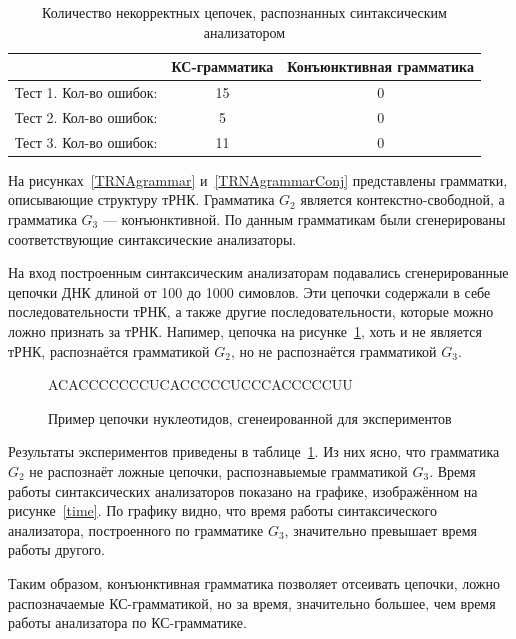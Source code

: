 \documentclass[14pt]{matmex-diploma}
\begin{document}
\begin{table}[h]
\begin{center}
  \begin{tabular}{ | c | c | c |}
    \hline
     & КС-грамматика & Конъюнктивная грамматика \\ \hline
    Тест 1. Кол-во ошибок: & 15 & 0 \\\hline
    Тест 2. Кол-во ошибок: & 5 & 0 \\\hline
    Тест 3. Кол-во ошибок: & 11 & 0 \\
    \hline
  \end{tabular}
\end{center}
\caption{Количество некорректных цепочек, распознанных синтаксическим анализатором}
\label{mistakes}
\end{table}

На рисунках~\ref{TRNAgrammar} и~\ref{TRNAgrammarConj} представлены грамматки, описывающие структуру тРНК. Грамматика $G_2$ является контекстно-свободной, а грамматика $G_3$ --- конъюнктивной. По данным грамматикам были сгенерированы соответствующие синтаксические анализаторы.

На вход построенным синтаксическим анализаторам подавались сгенерированные цепочки ДНК длиной от 100 до 1000 симовлов. Эти цепочки содержали в себе последовательности тРНК, а также другие последовательности, которые можно ложно признать за тРНК. Напимер, цепочка на рисунке~\ref{rnachain}, хоть и не является тРНК, распознаётся грамматикой $G_2$, но не распознаётся грамматикой $G_3$.

\begin{figure}
\begin{center}
ACACCCCCCCUCACCCCCUCCCACCCCCUU
\end{center}
\caption{Пример цепочки нуклеотидов, сгенеированной для экспериментов}
\label{rnachain}
\end{figure}


Результаты экспериментов приведены в таблице~\ref{mistakes}. Из них ясно, что грамматика $G_2$ не распознаёт ложные цепочки, распознавыемые грамматикой $G_3$. Время работы синтаксических анализаторов показано на графике, изображённом на рисунке~\ref{time}. По графику видно, что время работы синтаксического анализатора, построенного по грамматике $G_3$, значительно превышает время работы другого.

Таким образом, конъюнктивная грамматика позволяет отсеивать цепочки, ложно распозначаемые КС-грамматикой, но за время, значительно большее, чем время работы анализатора по КС-грамматике.
\end{document}
